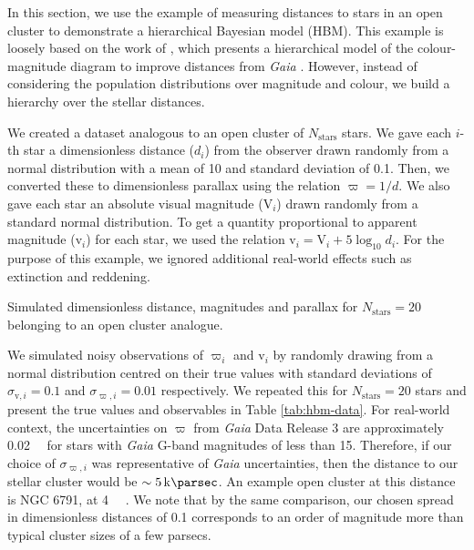 \newcommand{\appmag}{\ensuremath{\mathrm{v}}}
\newcommand{\absmag}{\ensuremath{\mathrm{V}}}

In this section, we use the example of measuring distances to stars in an open cluster to demonstrate a hierarchical Bayesian model (HBM). This example is loosely based on the work of \citet{Leistedt.Hogg2017}, which presents a hierarchical model of the colour-magnitude diagram to improve distances from \emph{Gaia} \citep{GaiaCollaboration.Prusti.ea2016}. However, instead of considering the population distributions over magnitude and colour, we build a hierarchy over the stellar distances.

We created a dataset analogous to an open cluster of \(N_\mathrm{stars}\) stars. We gave each \(i\)-th star a dimensionless distance (\(d_i\)) from the observer drawn randomly from a normal distribution with a mean of 10 and standard deviation of 0.1. Then, we converted these to dimensionless parallax using the relation \(\varpi = 1/d\). We also gave each star an absolute visual magnitude (\(\absmag_i\)) drawn randomly from a standard normal distribution. To get a quantity proportional to apparent magnitude (\(\appmag_i\)) for each star, we used the relation \(\appmag_i = \absmag_i + 5 \log_{10} d_i\). For the purpose of this example, we ignored additional real-world effects such as extinction and reddening.

\begin{table}[tb]
    \centering
    \caption{Simulated dimensionless distance, magnitudes and parallax for \(N_\mathrm{stars}=20\) belonging to an open cluster analogue.}
    \label{tab:hbm-data}
    
\end{table}

We simulated noisy observations of \(\varpi_i\) and \(\appmag_i\) by randomly drawing from a normal distribution centred on their true values with standard deviations of \(\sigma_{\appmag,i} = 0.1\) and \(\sigma_{\varpi,i} = 0.01\) respectively. We repeated this for \(N_\mathrm{stars}=20\) stars and present the true values and observables in Table \ref{tab:hbm-data}. For real-world context, the uncertainties on \(\varpi\) from \emph{Gaia} \citep{GaiaCollaboration.Prusti.ea2016} Data Release 3 \citep[][]{GaiaCollaboration.Vallenari.ea2022} are approximately \SI{0.02}{\milli\aarcsec} for stars with \emph{Gaia} G-band magnitudes of less than 15. Therefore, if our choice of \(\sigma_{\varpi,i}\) was representative of \emph{Gaia} uncertainties, then the distance to our stellar cluster would be \(\sim \SI{5}{\kilo\parsec}\). An example open cluster at this distance is NGC 6791, at \SI{4}{\kilo\parsec} \citep{Brogaard.Bruntt.ea2011}. We note that by the same comparison, our chosen spread in dimensionless distances of 0.1 corresponds to an order of magnitude more than typical cluster sizes of a few parsecs.

